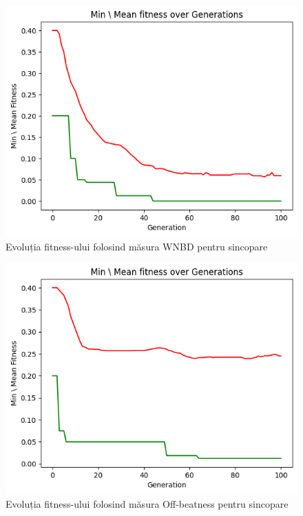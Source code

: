 \documentclass{beamer}
\begin{document}
\begin{frame}
    \begin{figure}
        \centering
        \includegraphics[scale=0.65]{genetic.png}
        \caption{Evoluția fitness-ului folosind măsura WNBD pentru sincopare}
    \end{figure}
\end{frame}

\begin{frame}
    \begin{figure}
        \centering
        \includegraphics[scale=0.65]{genetic_WNBD.png}
        \caption{Evoluția fitness-ului folosind măsura Off-beatness pentru sincopare}
    \end{figure}
\end{frame}
\end{document}
